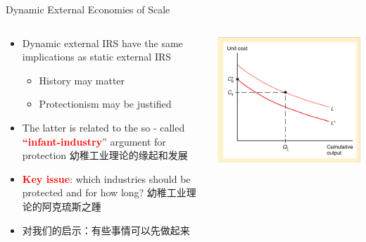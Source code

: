 \documentclass[10pt,hyperref={CJKbookmarks=true},xcolor=dvipsnames,aspectratio=169]{beamer}
\begin{document}
\begin{frame}{Dynamic External Economies of Scale }


\begin{columns}[onlytextwidth]
\begin{column}{0.5\textwidth}
\begin{itemize}
\item Dynamic external IRS have the same implications as static external
IRS 

\begin{itemize}
\item History may matter 
\item Protectionism may be justified 
\end{itemize}
\item The latter is related to the so - called \textbf{\textcolor{red}{“infant-industry}}”
argument for protection 幼稚工业理论的缘起和发展
\item \textbf{\textcolor{red}{Key issue}}: which industries should be protected
and for how long? 幼稚工业理论的阿克琉斯之踵
\item 对我们的启示：有些事情可以先做起来
\end{itemize}

\end{column}
\begin{column}{0.5\textwidth}
\includegraphics[width=\columnwidth]{fig/krugman/lec6-11}
\end{column}
\end{columns}

\end{frame}
\end{document}
